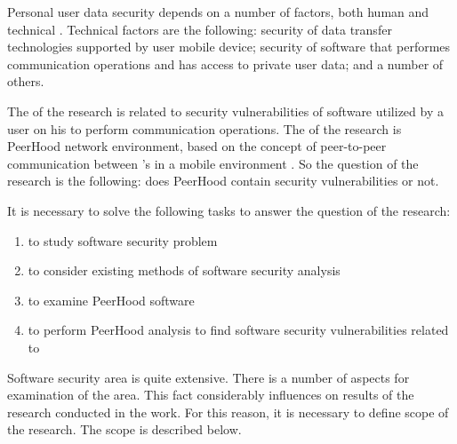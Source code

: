 %
Personal user data security depends on a number of factors, both human and technical . 
%
Technical factors are the following: security of data transfer technologies supported by user mobile device; security of software that performes communication operations and has access to private user data; and a number of others. 

%
The  of the research is related to security vulnerabilities of software utilized by a user on his  to perform communication operations. 
%
The  of the research is \The PeerHood network environment, based on the concept of peer-to-peer communication between 's in a mobile environment . 
%
So the question of the research is the following: does PeerHood contain security vulnerabilities or not. 

%
It is necessary to solve the following tasks to answer the question of the research: 
\begin{enumerate}
	\item to study \The software security problem
	\item to consider existing methods of software security analysis
	\item to examine \The PeerHood software
	\item to perform PeerHood analysis to find software security vulnerabilities related to 
\end{enumerate}

%
Software security area is quite extensive. 
%
There is a number of aspects for examination of the area. 
%
This fact considerably influences on \The results of the research conducted in the work. 
%
For this reason, it is necessary to define \The scope of the research. 
%
The scope is described below. 
